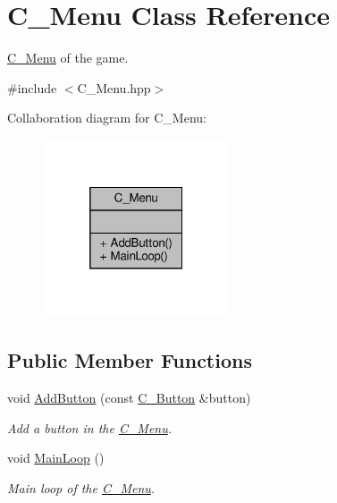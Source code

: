 \hypertarget{classC__Menu}{}\section{C\+\_\+\+Menu Class Reference}
\label{classC__Menu}


\hyperlink{classC__Menu}{C\+\_\+\+Menu} of the game.  




{\ttfamily \#include $<$C\+\_\+\+Menu.\+hpp$>$}



Collaboration diagram for C\+\_\+\+Menu\+:
\nopagebreak
\begin{figure}[H]
\begin{center}
\leavevmode
\includegraphics[width=157pt]{classC__Menu__coll__graph}
\end{center}
\end{figure}
\subsection*{Public Member Functions}
\begin{DoxyCompactItemize}
\item 
void \hyperlink{classC__Menu_a9a4f7a0022f39f35b7af9c5d2b6f31ec}{Add\+Button} (const \hyperlink{classC__Button}{C\+\_\+\+Button} \&button)
\begin{DoxyCompactList}\small\item\em Add a button in the \hyperlink{classC__Menu}{C\+\_\+\+Menu}. \end{DoxyCompactList}\item 
void \hyperlink{classC__Menu_a9529be708fad2c6deca21034bc37f59d}{Main\+Loop} ()
\begin{DoxyCompactList}\small\item\em Main loop of the \hyperlink{classC__Menu}{C\+\_\+\+Menu}. \end{DoxyCompactList}\end{DoxyCompactItemize}


